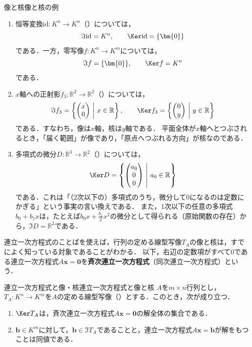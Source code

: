 \begin{example}{像と核}{像と核の例}
  \begin{enumerate}[label=(\arabic*),leftmargin=3.2em]
    \item 恒等変換$\mathrm{id} \colon K^n \to K^n$（）については，
      \[
        \Im \mathrm{id} = K^n, \qquad \Ker \mathrm{id} = \{\bm{0}\}
      \]
      である．一方，零写像$f \colon K^n \to K^m$については，
      \[
        \Im f = \{\bm{0}\}, \qquad \Ker f = K^n
      \]
      である．
    \item $x$軸への正射影$f_3 \colon \mathbb{R}^2 \to \mathbb{R}^2$（）については，
      \[
        \Im f_3 = \left\{ \begin{pmatrix} x \\ 0 \end{pmatrix} ~\middle|~ x \in \mathbb{R} \right\}, \qquad
        \Ker f_3 = \left\{ \begin{pmatrix} 0 \\ y \end{pmatrix} ~\middle|~ y \in \mathbb{R} \right\}
      \]
      である．すなわち，像は$x$軸，核は$y$軸である．
      平面全体が$x$軸へとつぶされるとき，「届く範囲」が像であり，「原点へつぶれる方向」が核なのである．
    \item 多項式の微分$D \colon \mathbb{R}^3 \to \mathbb{R}^2$（）については，
      \[
        \Ker D = \left\{ \begin{pmatrix} a_0 \\ 0 \\ 0 \end{pmatrix} ~\middle|~ a_0 \in \mathbb{R} \right\}
      \]
      である．これは「（$2$次以下の）多項式のうち，微分して$0$になるのは定数にかぎる」という事実の言い換えである．
      また，$1$次以下の任意の多項式$b_0 + b_1 x$は，たとえば$b_0 x + \frac{b_1}{2} x^2$の微分として得られる（原始関数の存在）から，$\Im D = \mathbb{R}^2$である．
  \end{enumerate}
\end{example}

連立一次方程式のことばを使えば，行列の定める線型写像$T_A$の像と核は，すでによく知っている対象であることがわかる．
以下，右辺の定数項がすべて$0$である連立一次方程式$A\bm{x} = \bm{0}$を\textbf{斉次連立一次方程式}（同次連立一次方程式）という．

\begin{prop}{連立一次方程式と像・核}{連立一次方程式と像と核}
  $A$を$m \times n$行列とし，$T_A \colon K^n \to K^m$を$A$の定める線型写像（）とする．このとき，次が成り立つ．
  \begin{enumerate}[label=(\roman*),leftmargin=3.2em]
    \item $\Ker T_A$は，斉次連立一次方程式$A\bm{x} = \bm{0}$の解全体の集合である．
    \item $\bm{b} \in K^m$に対して，$\bm{b} \in \Im T_A$であることと，連立一次方程式$A\bm{x} = \bm{b}$が解をもつことは同値である．
  \end{enumerate}
\end{prop}

